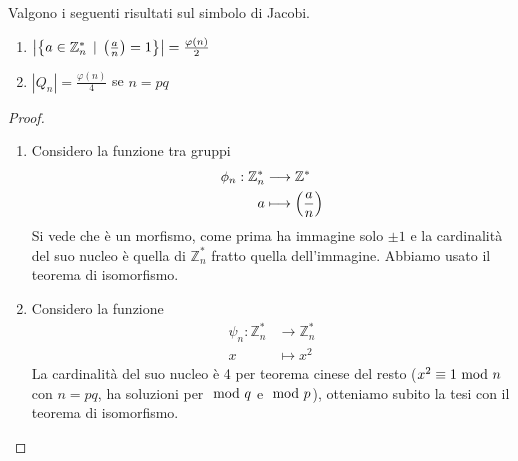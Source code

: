 \begin{proposizione} Valgono i seguenti risultati sul simbolo di Jacobi.
	\begin{enumerate}
		\item $\left|\left\{a\in\mathbb{Z}_n^* \, \mid \, \left(\frac{a}{n}\right)=1\right\}\right|=\frac{\varphi(n)}{2}$
		\item $\left|Q_n\right|=\frac{\varphi(n)}{4}$ se $n=pq$ 
	\end{enumerate}
\end{proposizione}
\begin{proof}\
	\begin{enumerate}
		\item Considero la funzione tra gruppi
		\begin{align*}
		\phi_n:\mathbb{Z}_n^*&\longrightarrow\mathbb{Z}^*\\
		a&\longmapsto\left(\frac{a}{n}\right)
		\end{align*}
		Si vede che è un morfismo, come prima ha immagine solo $\pm1$ e la cardinalità del suo nucleo è quella di $\mathbb{Z}_n^*$ fratto quella dell'immagine. Abbiamo usato il teorema di isomorfismo.
		\item Considero la funzione 
		\begin{align*}
		\psi_n:\mathbb{Z}_n^*&\longrightarrow\mathbb{Z}_n^*\\
		x&\longmapsto x^2
		\end{align*}
		La cardinalità del suo nucleo è 4 per teorema cinese del resto ($x^2\equiv1 \ \mathrm{mod}\ n$ con $n=pq$, ha soluzioni per $\ \mathrm{mod}\ q$ e $\ \mathrm{mod}\ p$), otteniamo subito la tesi con il teorema di isomorfismo.
	\end{enumerate}
\end{proof}
